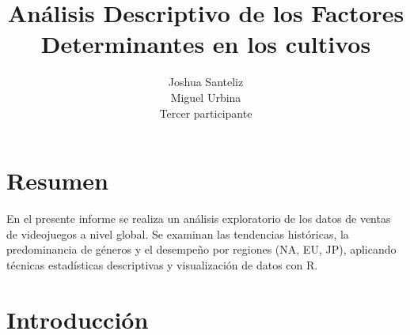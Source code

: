 \documentclass[oneside,11pt]{Latex/Classes/PhDthesisPSnPDF}
\title{Análisis Descriptivo de los Factores Determinantes en los
cultivos}
\author{Joshua Santeliz \\ Miguel Urbina \\ Tercer participante}
\begin{document}
\maketitle

\frontmatter


\setcounter{secnumdepth}{3}
\setcounter{tocdepth}{3}

\tableofcontents



\cleardoublepage

  \cleardoublepage       %
  \chapter*{Resumen}     %
  
  En el presente informe se realiza un análisis exploratorio de los
datos de ventas de videojuegos a nivel global. Se examinan las
tendencias históricas, la predominancia de géneros y el desempeño por
regiones (NA, EU, JP), aplicando técnicas estadísticas descriptivas y
visualización de datos con
R.             %
  
  \cleardoublepage

\mainmatter
\def\baselinestretch{1.5}

\chapter*{Introducción}
\end{document}
